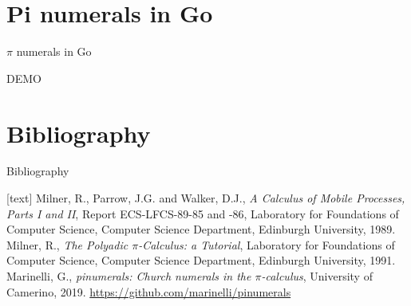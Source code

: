 \documentclass{beamer}
\begin{document}
\section{Pi numerals in Go}
\begin{frame}[fragile]{$\pi$ numerals in Go}

\begin{center}
\vspace*{\fill}
\begingroup
\centering
{\Huge DEMO}
\endgroup
\vspace*{\fill}
\end{center}

\end{frame}



\section{Bibliography}

\begin{frame}{Bibliography}

\begin{thebibliography}{5}
\footnotesize
{}[text]
 Milner, R., Parrow, J.G. and Walker, D.J., \emph{A Calculus of Mobile Processes, Parts I and II}, Report ECS-LFCS-89-85 and -86, Laboratory for Foundations of Computer Science, Computer Science Department, Edinburgh University, 1989.
 Milner, R., \emph{The Polyadic $\pi$-Calculus: a Tutorial}, Laboratory for Foundations of Computer Science, Computer Science Department, Edinburgh University, 1991.
 Marinelli, G., \emph{pinumerals: Church numerals in the $\pi$-calculus}, University of Camerino, 2019. \url{https://github.com/marinelli/pinumerals}
\end{thebibliography}

\end{frame}
\end{document}
